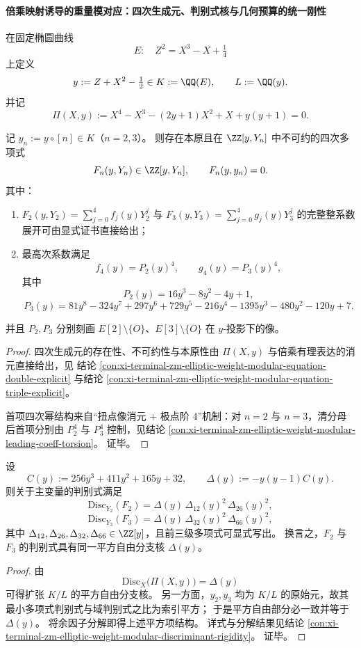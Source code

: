 \paragraph{倍乘映射诱导的重量模对应：四次生成元、判别式核与几何预算的统一刚性}
在固定椭圆曲线
\[
E:\quad Z^2=X^3-X+\tfrac14
\]
上定义
\[
y:=Z+X^2-\tfrac12\in K:=\QQ(E),\qquad L:=\QQ(y).
\]
并记
\[
\Pi(X,y):=X^4-X^3-(2y+1)X^2+X+y(y+1)=0.
\]

\begin{theorem}[二倍乘与三倍乘的四次模方程及首项扭点刚性]\label{thm:xi-elliptic-weight-modular-f2f3-leading-rigidity-closure}
记 \(y_n:=y\circ[n]\in K\)（\(n=2,3\)）。
则存在本原且在 \(\ZZ[y,Y_n]\) 中不可约的四次多项式
\[
F_n(y,Y_n)\in \ZZ[y,Y_n],\qquad F_n(y,y_n)=0.
\]
其中：
\begin{enumerate}
  \item \(F_2(y,Y_2)=\sum_{j=0}^4 f_j(y)Y_2^j\) 与 \(F_3(y,Y_3)=\sum_{j=0}^4 g_j(y)Y_3^j\) 的完整整系数展开可由显式证书直接给出；
  \item 最高次系数满足
  \[
  f_4(y)=P_2(y)^4,\qquad g_4(y)=P_3(y)^4,
  \]
  其中
  \[
  P_2(y)=16y^3-8y^2-4y+1,
  \]
  \[
  P_3(y)=81y^8-324y^7+297y^6+729y^5-216y^4-1395y^3-480y^2-120y+7.
  \]
\end{enumerate}
并且 \(P_2,P_3\) 分别刻画 \(E[2]\setminus\{O\}\)、\(E[3]\setminus\{O\}\) 在 \(y\)-投影下的像。
\end{theorem}
\begin{proof}
四次生成元的存在性、不可约性与本原性由
\(\Pi(X,y)\) 与倍乘有理表达的消元直接给出，见
结论 \ref{con:xi-terminal-zm-elliptic-weight-modular-equation-double-explicit}
与结论 \ref{con:xi-terminal-zm-elliptic-weight-modular-equation-triple-explicit}。
\par
首项四次幂结构来自“扭点像消元 + 极点阶 \(4\)”机制：对 \(n=2\) 与 \(n=3\)，清分母后首项分别由
\(
P_2^4
\) 与
\(
P_3^4
\)
控制，见结论
\ref{con:xi-terminal-zm-elliptic-weight-modular-leading-coeff-torsion}。
证毕。
\end{proof}

\begin{theorem}[判别式平方自由核的统一性与索引平方分解]\label{thm:xi-elliptic-weight-modular-discriminant-kernel-unified-closure}
设
\[
C(y):=256y^3+411y^2+165y+32,\qquad \Delta(y):=-y(y-1)C(y).
\]
则关于主变量的判别式满足
\[
\mathrm{Disc}_{Y_2}(F_2)=\Delta(y)\,\Delta_{12}(y)^2\,\Delta_{26}(y)^2,
\]
\[
\mathrm{Disc}_{Y_3}(F_3)=\Delta(y)\,\Delta_{32}(y)^2\,\Delta_{66}(y)^2,
\]
其中 \(\Delta_{12},\Delta_{26},\Delta_{32},\Delta_{66}\in\ZZ[y]\)，且前三级多项式可显式写出。
换言之，\(F_2\) 与 \(F_3\) 的判别式具有同一平方自由分支核 \(\Delta(y)\)。
\end{theorem}
\begin{proof}
由
\[
\mathrm{Disc}_X\!\bigl(\Pi(X,y)\bigr)=\Delta(y)
\]
可得扩张 \(K/L\) 的平方自由分支核。
另一方面，\(y_2,y_3\) 均为 \(K/L\) 的原始元，故其最小多项式判别式与域判别式之比为索引平方；
于是平方自由部分必一致并等于 \(\Delta(y)\)。
将余因子分解即得上述平方项结构。
详式与分解结果见结论
\ref{con:xi-terminal-zm-elliptic-weight-modular-discriminant-rigidity}。
证毕。
\end{proof}


